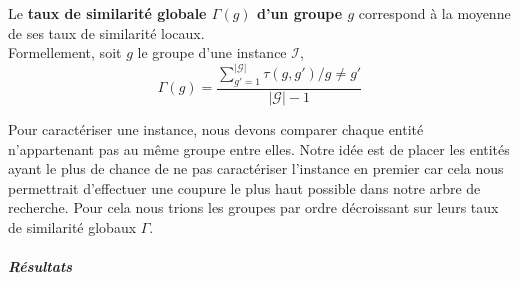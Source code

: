 \begin{definition}
Le \textbf{taux de similarité globale $\Gamma(g)$ d'un groupe $g$} correspond à la moyenne de ses taux de similarité locaux.\\
Formellement, soit $g$ le groupe d'une instance $\mathcal{I}$,
$$ \Gamma(g)=\frac{\sum_{g'=1}^{|\mathcal{G}|}\tau(g,g') /g \neq g'}{|\mathcal{G}|-1} $$
\end{definition}

Pour caractériser une instance, nous devons comparer chaque entité n'appartenant pas au même groupe entre elles. Notre idée est de placer les entités ayant le plus de chance de ne pas caractériser l'instance en premier car cela nous permettrait d'effectuer une coupure le plus haut possible dans notre arbre de recherche. Pour cela nous trions les groupes par ordre décroissant sur leurs taux de similarité globaux $\Gamma$.



\subparagraph{Résultats}

%	
%	
%
%	
%	
%
%	
%	

